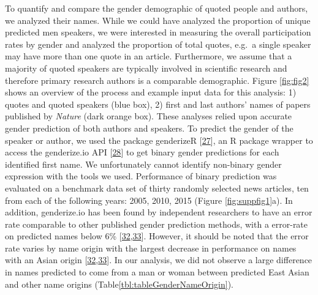 To quantify and compare the gender demographic of quoted people and authors, we analyzed their names.
While we could have analyzed the proportion of unique predicted men speakers, we were interested in measuring the overall participation rates by gender and analyzed the proportion of total quotes, e.g.~a single speaker may have more than one quote in an article.
Furthermore, we assume that a majority of quoted speakers are typically involved in scientific research and therefore primary research authors is a comparable demographic.
Figure \ref{fig:fig2} shows an overview of the process and example input data for this analysis: 1) quotes and quoted speakers (blue box), 2) first and last authors' names of papers published by \emph{Nature} (dark orange box).
These analyses relied upon accurate gender prediction of both authors and speakers.
To predict the gender of the speaker or author, we used the package genderizeR {[}\protect\hyperlink{ref-cLM5pKQN}{27}{]}, an R package wrapper to access the genderize.io API {[}\protect\hyperlink{ref-15Jxi2IvD}{28}{]} to get binary gender predictions for each identified first name.
We unfortunately cannot identify non-binary gender expression with the tools we used.
Performance of binary prediction was evaluated on a benchmark data set of thirty randomly selected news articles, ten from each of the following years: 2005, 2010, 2015 (Figure \ref{fig:suppfig1}a).
In addition, genderize.io has been found by independent researchers to have an error rate comparable to other published gender prediction methods, with a error-rate on predicted names below 6\% {[}\protect\hyperlink{ref-ODb9u77d}{32},\protect\hyperlink{ref-8CuPqphs}{33}{]}.
However, it should be noted that the error rate varies by name origin with the largest decrease in performance on names with an Asian origin {[}\protect\hyperlink{ref-ODb9u77d}{32},\protect\hyperlink{ref-8CuPqphs}{33}{]}.
In our analysis, we did not observe a large difference in names predicted to come from a man or woman between predicted East Asian and other name origins (Table\ref{tbl:tableGenderNameOrigin}).

